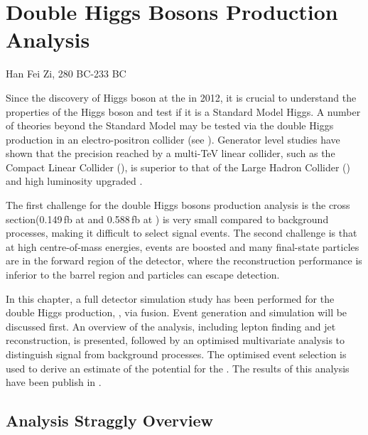 \chapter{Double Higgs Bosons Production Analysis}
\label{chap:DoubleHiggs}

%
{Han Fei Zi, 280 BC-233 BC}%

Since the discovery of Higgs boson at the \LHC in 2012\cite{Aad:2012tfa,Chatrchyan:2012ufa}, it is crucial to understand the properties of the Higgs boson and test if it is a Standard Model Higgs. A number of theories beyond the Standard Model may be tested via the double Higgs production in an electro-positron collider (see ). Generator level studies have shown that the precision reached by a multi-TeV linear collider, such as the Compact Linear Collider (\CLIC), is superior to that of the Large Hadron Collider (\LHC) and high luminosity upgraded \LHC  \cite{Contino:2013gna}.


The first challenge for the double Higgs bosons production analysis is the cross section(0.149\,fb at  and 0.588\,fb at ) is very small compared to background processes, making it difficult to select signal events. The second challenge is that at high centre-of-mass energies, events are boosted and many final-state particles are in the forward region of the detector, where the reconstruction performance is inferior to the barrel region and particles can escape detection.

In this chapter, a full \CLICILD detector simulation study has been performed for the double Higgs production, \eeToHH, via \WW fusion. Event generation and simulation will be discussed first. An overview of the analysis, including lepton finding and jet reconstruction, is presented, followed by an optimised multivariate analysis to distinguish signal from background processes. The optimised event selection is used to derive an estimate of the potential for the \CLIC. The results of this analysis have been publish in .

\section{Analysis Straggly Overview}

